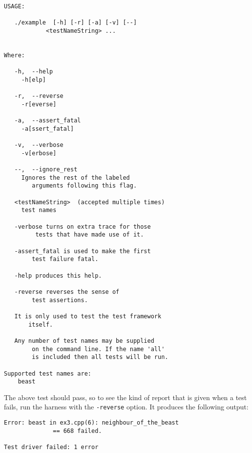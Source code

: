 \documentclass{book}
\begin{document}
\begin{verbatim}
USAGE: 

   ./example  [-h] [-r] [-a] [-v] [--]
            <testNameString> ...


Where: 

   -h,  --help
     -h[elp]

   -r,  --reverse
     -r[everse]

   -a,  --assert_fatal
     -a[ssert_fatal]

   -v,  --verbose
     -v[erbose]

   --,  --ignore_rest
     Ignores the rest of the labeled 
        arguments following this flag.

   <testNameString>  (accepted multiple times)
     test names

   -verbose turns on extra trace for those
         tests that have made use of it.

   -assert_fatal is used to make the first 
        test failure fatal.

   -help produces this help.

   -reverse reverses the sense of 
        test assertions.

   It is only used to test the test framework
       itself.

   Any number of test names may be supplied
        on the command line. If the name 'all' 
        is included then all tests will be run.

Supported test names are:
    beast
\end{verbatim}

The above test should pass, so to see the kind of report that
is given when a test fails, run the harness with the {\tt -reverse}
option. It produces the following output:

\begin{verbatim}
Error: beast in ex3.cpp(6): neighbour_of_the_beast
              == 668 failed.

Test driver failed: 1 error
\end{verbatim}

\end{document}
